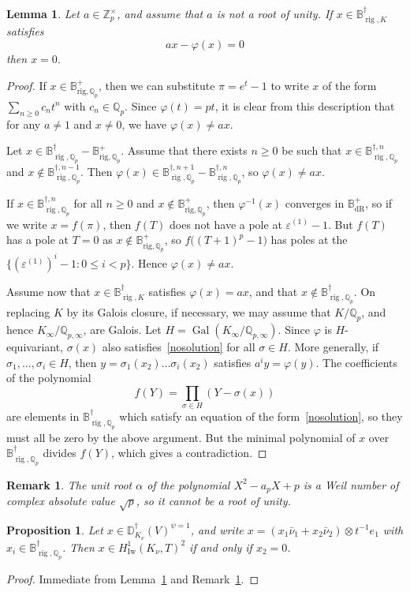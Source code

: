 \documentclass{amsart}
\newcommand{\QQ}{\mathbb Q}
\newcommand{\ZZ}{\mathbb Z}
\newcommand{\BB}{\mathbb B}
\newcommand{\DD}{\mathbb D}
\newcommand{\Brig}{\BB^+_{\mathrm{rig},\QQ_p}}
\DeclareMathOperator{\Gal}{Gal}
\DeclareMathOperator{\Iw}{Iw}
\DeclareMathOperator{\rig}{rig}
\newcommand{\Qp}{\QQ_p}
\newcommand{\vp}{\varphi}
\newtheorem{proposition}[theorem]{Proposition}
\newtheorem{lemma}[theorem]{Lemma}
\newtheorem{remark}[theorem]{Remark}
\begin{document}
   \begin{lemma}\label{onlytrivialsolution}
    Let $a\in \ZZ_p^\times$, and assume that $a$ is not a root of unity. If $x\in\BB^\dagger_{\rig,K}$ satisfies 
    \begin{equation}\label{nosolution}
     a x-\vp(x)=0
    \end{equation}
    then $x=0$.
   \end{lemma}
   \begin{proof}
    If $x\in \Brig$, then we can substitute $\pi=e^t-1$ to write $x$ of the form $\sum_{n\geq 0}c_nt^n$ with $c_n\in\QQ_p$. Since $\vp(t)=pt$, it is clear from this description that for any $a\neq 1$ and $x\ne0$, we have $\vp(x)\neq ax$. 
    
    Let $x\in\BB^\dagger_{\rig,\Qp}-\Brig$. Assume that there exists $n\ge 0$ be such that $x\in \BB^{\dagger,n}_{\rig,\QQ_p}$ and $x\not\in \BB^{\dagger,n-1}_{\rig,\QQ_p}$. Then $\vp(x)\in \BB^{\dagger,n+1}_{\rig,\QQ_p}-\BB^{\dagger,n}_{\rig,\QQ_p}$, so $\vp(x)\neq a x$.
    
    If $x\in\BB^{\dagger,n}_{\rig,\QQ_p}$ for all $n\ge0$ and $x\not\in\Brig$, then $\vp^{-1}(x)$ converges in $\BB^+_{\mathrm{dR}}$, so if we write $x=f(\pi)$, then $f(T)$ does not have a pole at $\varepsilon^{(1)}-1$. But $f(T)$ has a pole at $T=0$ as $x\not\in\Brig$, so $f\big( (T+1)^p-1\big)$ has poles at the $\{(\varepsilon^{(1)})^i-1:0\leq i<p\}$. Hence $\vp(x)\neq ax$.
    
    Assume now that $x\in \BB^\dagger_{\rig,K}$ satisfies $\vp(x)=ax$, and that $x\not\in \BB^{\dagger}_{\rig,\QQ_p}$. On replacing $K$ by its Galois closure, if necessary, we may assume that $K\slash\QQ_p$, and hence $K_{\infty}\slash\QQ_{p,\infty}$, are Galois. Let $H=\Gal(K_{\infty}\slash \QQ_{p,\infty})$. Since $\vp$ is $H$-equivariant, $\sigma(x)$ also satisfies~\eqref{nosolution} for all $\sigma\in H$. More generally, if $\sigma_1,\dots,\sigma_i\in H$, then $y=\sigma_1(x_2)\dots\sigma_i(x_2)$ satisfies $a^iy=\vp(y)$. The coefficients of the polynomial
    \[ f(Y)=\prod_{\sigma\in H} (Y-\sigma(x))\]
    are elements in $\BB^{\dagger}_{\rig,\QQ_p}$ which satisfy an equation of the form~\eqref{nosolution}, so they must all be zero by the above argument. But the minimal polynomial of $x$ over $\BB^\dagger_{\rig,\QQ_p}$ divides $f(Y)$, which gives a contradiction. 
   \end{proof}
   
   \begin{remark}\label{Weilnumber}
    The unit root $\alpha$ of the polynomial $X^2-a_pX+p$ is a Weil number of complex absolute value $\sqrt{p}$, so it cannot be a root of unity.
   \end{remark}
   \begin{proposition}
    Let $x\in \DD^\dagger_{K_\nu}(V)^{\psi=1}$, and write $x=(x_1 \bar{\nu}_1+ x_2 \bar{\nu}_2)\otimes t^{-1}e_1$ with $x_i\in \BB^\dagger_{\rig,\QQ_p}$. Then $x\in H^1_{\Iw}(K_\nu,T)^2$ if and only if $x_2=0$.
   \end{proposition}
   \begin{proof}
    Immediate from Lemma~\ref{onlytrivialsolution} and Remark~\ref{Weilnumber}.
   \end{proof}
   
\end{document}
